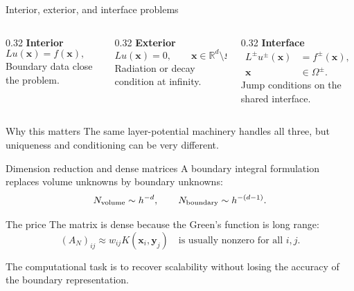 \documentclass[aspectratio=169,11pt]{beamer}
\newcommand{\R}{\mathbb{R}}
\newcommand{\x}{\bm{x}}
\newcommand{\y}{\bm{y}}
\begin{document}
\begin{frame}{Interior, exterior, and interface problems}
\small
\begin{columns}[T,totalwidth=\textwidth]
\begin{column}{0.32\textwidth}
\textbf{Interior}
\[
L u(\x)=f(\x),\qquad \x\in\Omega.
\]
Boundary data close the problem.
\end{column}
\begin{column}{0.32\textwidth}
\textbf{Exterior}
\[
L u(\x)=0,\qquad \x\in\R^d\setminus\overline{\Omega}.
\]
Radiation or decay condition at infinity.
\end{column}
\begin{column}{0.32\textwidth}
\textbf{Interface}
\[
\begin{aligned}
L^\pm u^\pm(\x)&=f^\pm(\x),\\
\x&\in\Omega^\pm.
\end{aligned}
\]
Jump conditions on the shared interface.
\end{column}
\end{columns}

\begin{block}{Why this matters}
The same layer-potential machinery handles all three, but uniqueness and
conditioning can be very different.
\end{block}
\end{frame}

\begin{frame}{Dimension reduction and dense matrices}
\small
A boundary integral formulation replaces volume unknowns by boundary unknowns:
\[
N_{\rm volume}\sim h^{-d},
\qquad
N_{\rm boundary}\sim h^{-(d-1)}.
\]

\begin{block}{The price}
The matrix is dense because the Green's function is long range:
\[
(A_N)_{ij}\approx w_{ij}K(\x_i,\y_j)
\quad\text{is usually nonzero for all }i,j.
\]
\end{block}

The computational task is to recover scalability without losing the accuracy
of the boundary representation.
\end{frame}
\end{document}

